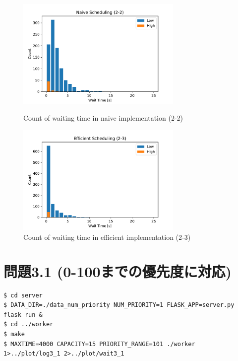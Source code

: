 \begin{figure}[htbp]
  \begin{minipage}[b]{0.40\hsize}
      \centering
      \includegraphics[width=8cm]{imgs/wait2_2.pdf}
      \caption{Count of waiting time in naive implementation (2-2)}
      \label{fig:wait2_2}
  \end{minipage}
  \begin{minipage}{0.1\hsize}
    \hspace{0.05\hsize}
  \end{minipage}
  \begin{minipage}[b]{0.40\hsize}
      \centering
      \includegraphics[width=8cm]{imgs/wait2_3.pdf}
      \caption{Count of waiting time in efficient implementation (2-3)}
      \label{fig:wait2_3}
  \end{minipage}
\end{figure}

\clearpage
\section*{問題3.1 (0-100までの優先度に対応)}

\begin{lstlisting}[]
$ cd server
$ DATA_DIR=./data_num_priority NUM_PRIORITY=1 FLASK_APP=server.py flask run &
$ cd ../worker
$ make
$ MAXTIME=4000 CAPACITY=15 PRIORITY_RANGE=101 ./worker 1>../plot/log3_1 2>../plot/wait3_1
\end{lstlisting}

